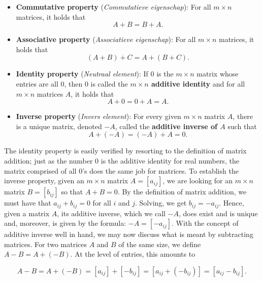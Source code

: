 \smallskip

\begin{theorem} \label{matrixadditionprops}
\begin{itemize}
	\item  \textbf{Commutative property} (\textit{Commutatieve eigenschap}):  For all $m \times n$ matrices, it holds that 
	\[A + B = B + A.\]
	\item  \textbf{Associative property}  (\textit{Associatieve eigenschap}):  For all $m \times n$ matrices, it holds that 
	\[(A + B) + C = A + (B + C). \]
	\item  \textbf{Identity property}  (\textit{Neutraal element}): If $0$ is the $m \times n$ matrix whose entries are all $0$, then $0$ is called the \textbf{\boldmath $m \times n$ additive identity} and for all $m \times n$ matrices $A$, it holds that
	\[A + 0 = 0 + A = A.\] 
	\item  \textbf{Inverse property} (\textit{Invers element}): For every given $m \times n$ matrix $A$, there is a unique matrix, denoted $-A$, called the  \textbf{additive inverse of \boldmath $A$} such that \[A + (-A) = (-A) + A = 0.\]
\end{itemize}
\end{theorem}


\smallskip

The identity property is easily verified by resorting to the definition of matrix addition;  just as the number $0$ is the additive identity for real numbers, the matrix comprised of all $0$'s does the same job for matrices.  To establish the inverse property, given an $m\times n$ matrix $A=\left[a_{ij}\right]$, we are looking for an $m\times n$ matrix $B = \left[b_{ij}\right]$ so that $A + B = 0$.  By the definition of matrix addition, we must have that $a_{ij} + b_{ij} = 0$ for all $i$ and $j$.  Solving,  we get $b_{ij} = -a_{ij}$.   Hence, given a matrix $A$, its additive inverse, which we call $-A$, does exist and is unique and, moreover, is given by the formula:  $-A = \left[ - a_{ij}\right]$. 
With the concept of additive inverse well in hand, we may now discuss what is meant by subtracting matrices. For two matrices $A$ and $B$ of the same size, we define $A-B = A + (-B)$.  At the level of entries, this amounts to

\[A-B = A + (-B) = \left[a_{ij}\right]+ \left[-b_{ij}\right] = \left[a_{ij} + \left(-b_{ij}\right) \right]= \left[a_{ij} - b_{ij} \right].\]

